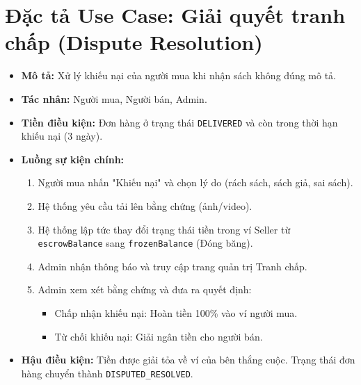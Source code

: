 \documentclass[../main.tex]{subfiles}
\begin{document}
\section{Đặc tả Use Case: Giải quyết tranh chấp (Dispute Resolution)}
\begin{itemize}
    \item \textbf{Mô tả:} Xử lý khiếu nại của người mua khi nhận sách không đúng mô tả.
    \item \textbf{Tác nhân:} Người mua, Người bán, Admin.
    \item \textbf{Tiền điều kiện:} Đơn hàng ở trạng thái \texttt{DELIVERED} và còn trong thời hạn khiếu nại (3 ngày).
    \item \textbf{Luồng sự kiện chính:}
        \begin{enumerate}
            \item Người mua nhấn "Khiếu nại" và chọn lý do (rách sách, sách giả, sai sách).
            \item Hệ thống yêu cầu tải lên bằng chứng (ảnh/video).
            \item Hệ thống lập tức thay đổi trạng thái tiền trong ví Seller từ \texttt{escrowBalance} sang \texttt{frozenBalance} (Đóng băng).
            \item Admin nhận thông báo và truy cập trang quản trị Tranh chấp.
            \item Admin xem xét bằng chứng và đưa ra quyết định:
            \begin{itemize}
                \item Chấp nhận khiếu nại: Hoàn tiền 100\% vào ví người mua.
                \item Từ chối khiếu nại: Giải ngân tiền cho người bán.
            \end{itemize}
        \end{enumerate}
    \item \textbf{Hậu điều kiện:} Tiền được giải tỏa về ví của bên thắng cuộc. Trạng thái đơn hàng chuyển thành \texttt{DISPUTED\_RESOLVED}.
\end{itemize}
\end{document}

